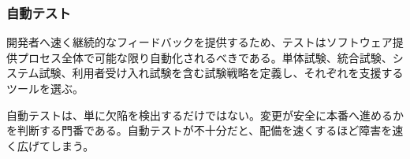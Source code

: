 \subsubsection{自動テスト}

開発者へ速く継続的なフィードバックを提供するため、テストはソフトウェア提供プロセス全体で可能な限り自動化されるべきである。単体試験、統合試験、システム試験、利用者受け入れ試験を含む試験戦略を定義し、それぞれを支援するツールを選ぶ。

自動テストは、単に欠陥を検出するだけではない。変更が安全に本番へ進めるかを判断する門番である。自動テストが不十分だと、配備を速くするほど障害を速く広げてしまう。
